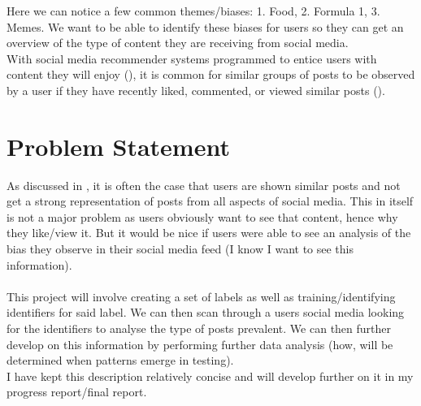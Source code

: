 \documentclass[a4paper,fleqn,10pt]{article}
\begin{document}
Here we can notice a few common themes/biases: 1. Food, 2. Formula 1, 3. Memes. We want to be able to identify these biases for users
so they can get an overview of the type of content they are receiving from social media.\\
With social media recommender systems programmed to entice users with content they will enjoy (\cite{recommenderSystems}), it is common for similar groups of posts
to be observed by a user if they have recently liked, commented, or viewed similar posts (\cite{instagram_how_nodate}).

\section{Problem Statement}
\label{sec:problem}

As discussed in , it is often the case that users are shown similar posts and not get a strong representation of posts
from all aspects of social media. This in itself is not a major problem as users obviously want to see that content, hence why they
like/view it. But it would be nice if users were able to see an analysis of the bias they observe in their social media feed (I know I
want to see this information).\\\\
This project will involve creating a set of labels as well as training/identifying identifiers for said label. We can then scan
through a users social media looking for the identifiers to analyse the type of posts prevalent. We can then further develop on this
information by performing further data analysis (how, will be determined when patterns emerge in testing).\\
I have kept this description relatively concise and will develop further on it in my progress report/final report.


\end{document}
